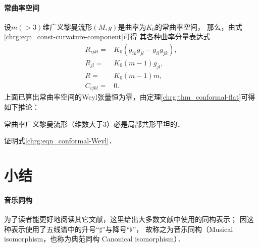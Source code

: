 \paragraph{常曲率空间}
设$m(>3)$维广义黎曼流形$(M,g)$是曲率为$K_0$的常曲率空间，
那么，由式\eqref{chrg:eqn_const-curvature-component}可得
其各种曲率分量表达式
\begin{align}
    R_{ijkl}=&  K_0 ( g_{ik}g_{jl}- g_{il}g_{jk}  ), \\
    R_{jl}=&  K_0 ( m - 1  ) g_{jl}, \label{chrg:eqn_CR-ricci} \\
    R=& K_0 ( m - 1  ) m , \\
    C_{ijkl}=& 0 .
\end{align}
上面已算出常曲率空间的Weyl张量恒为零，由定理\ref{chrg:thm_conformal-flat}可得如下推论：
\begin{corollary}\label{chrg:thm_conformal-flat-const-curvature}
    常曲率广义黎曼流形（维数大于3）必是局部共形平坦的．
\end{corollary}




\begin{exercise}
	证明式\eqref{chrg:eqn_conformal-Weyl}．
\end{exercise}


\section*{小结}

\paragraph{音乐同构}\label{chrg:sec_music-iso}
为了读者能更好地阅读其它文献，这里给出大多数文献中使用的同构表示；
因这种表示使用了五线谱中的升号“$\sharp$”与降号“$\flat$”，
故称之为{\heiti 音乐同构}（Musical isomorphism，也称为典范同构 Canonical isomorphism）．


